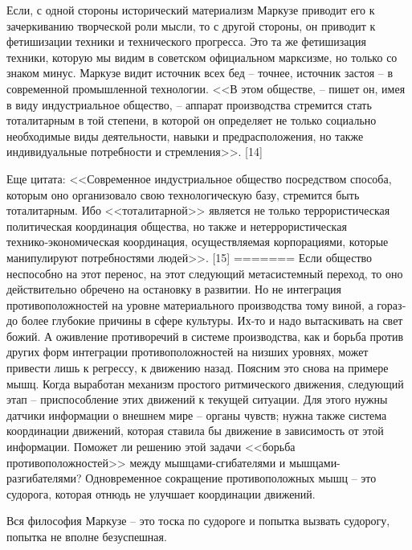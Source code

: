 \documentclass{book}
\begin{document}
{Если, с одной стороны исторический материализм Маркузе приводит его к зачеркиванию творческой роли мысли, то с дру­гой стороны, он приводит к фетишизации техники и техниче­ского прогресса. Это та же фетишизация техники, которую мы видим в советском официальном марксизме, но только со знаком минус. Маркузе видит источник всех бед -- точнее, источник застоя -- в современной промышленной технологии. <<В этом обществе, -- пишет он, имея в виду индустриальное общество, -- аппарат производства стремится стать тоталитар­ным в той степени, в которой он определяет не только соци­ально необходимые виды деятельности, навыки и предрасполо­жения, но также индивидуальные потребности и стремления>>. [14]

Еще цитата: <<Современное индустриальное общество посред­ством способа, которым оно организовало свою технологиче­скую базу, стремится быть тоталитарным. Ибо <<тоталитарной>> является не только террористическая политическая коорди­нация общества, но также и нетеррористическая технико‑эко­номическая координация, осуществляемая корпорациями, кото­рые манипулируют потребностями людей>>. [15]
=======
Если общество неспособно на этот перенос, на этот следу­ющий метасистемный переход, то оно действительно обречено на остановку в развитии. Но не интеграция противоположно­стей на уровне материального производства тому виной, а гораз­до более глубокие причины в сфере культуры. Их-то и надо вытаскивать на свет божий. А оживление противоречий в систе­ме производства, как и борьба против других форм интегра­ции противоположностей на низших уровнях, может привести лишь к регрессу, к движению назад. Поясним это снова на при­мере мышц. Когда выработан механизм простого ритмического движения, следующий этап -- приспособление этих движений к текущей ситуации. Для этого нужны датчики информации о внешнем мире -- органы чувств; нужна также система коор­динации движений, которая ставила бы движение в зависи­мость от этой информации. Поможет ли решению этой задачи <<борьба противоположностей>> между мышцами-сгибателями и мышцами-разгибателями? Одновременное сокращение проти­воположных мышц -- это судорога, которая отнюдь 
не улучшает координации движений.

Вся философия Маркузе -- это тоска по судороге и попытка вызвать судорогу, попытка не вполне безуспешная.

}
\end{document}
